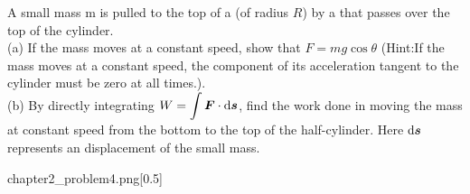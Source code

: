 \begin{example}
	 A small mass m is pulled to the top of a   (of radius $R$) by a  that passes over the top of the cylinder.\\
	(a) If the mass moves at a constant speed, show that $F=mg\cos\theta$ (Hint:If the mass moves at a constant speed, the component of its acceleration tangent to the cylinder must be zero at all times.).\\
	(b) By directly integrating $\displaystyle W=\int \vec{F}\cdot \dif \vec{s}$, find the work done in moving the mass at constant speed from the bottom to the top of the half-cylinder. Here $\dif \vec{s}$ represents an  displacement of the small mass.
	
	\begin{singlefigure}[第五题图]{chapter2_problem4.png}[0.5]
	\end{singlefigure}
\end{example}